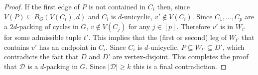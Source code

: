 \documentclass{patmorin}
\begin{document}
\begin{proof}
If the first edge of $P$ is not contained in $C_i$ then, since $V(P)\subseteq B_G(V(C_i),d)$ and $C_i$ is $d$-unicyclic, $v'\not\in V(C_i)$.  Since $C_1,\ldots,C_p$ are a $2d$-packing of cycles in $G$, $v\not\in V(C_j)$ for any $j\in[p]$. Therefore $v'$ is in $W_{t'}$ for some admissible tuple $t'$.  This implies that the (first or second) leg of $W_{t'}$ that contains $v'$ has an endpoint in $C_i$.  Since $C_i$ is $d$-unicyclic, $P\subseteq W_{t'}\subseteq D'$, which contradicts the fact that $D$ and $D'$ are vertex-disjoint.
This completes the proof that $\mathcal{D}$ is a $d$-packing in $G$. 
Since $|\mathcal{D}|\geq k$ this is a final contradiction.
\end{proof}



\end{document}
